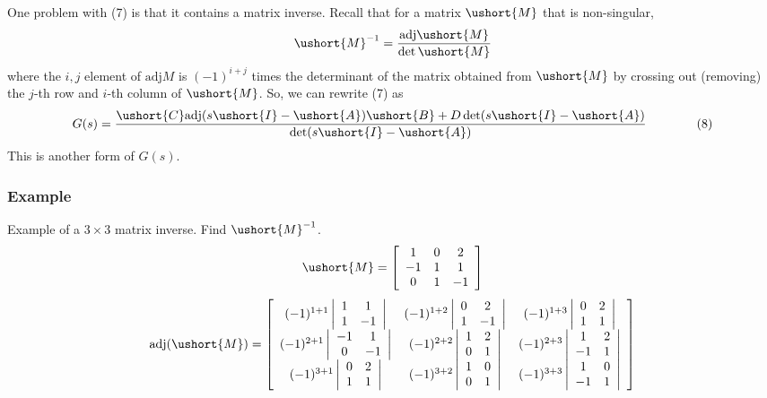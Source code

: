 \documentclass{book}
\newcommand{\adj}{\text{adj}}
\def\ubar#1{\ushort{#1}}
\newcommand{\exmp}{\subsubsection*{Example}}
\begin{document}
One problem with (7) is that it contains a matrix inverse. Recall that for a matrix $ \ubar{M} $ that is non-singular,
\[ \ubar{M}^{-1} = \frac{\adj{\ubar{M}}}{\det{\ubar{M}}} \]
where the $ i,j $ element of $ \adj{M} $ is $ (-1)^{i+j} $ times the determinant of the matrix obtained from $ \ubar{M} $ by crossing out (removing) the $ j $-th row and $ i $-th column of $ \ubar{M} $. So, we can rewrite (7) as 
\[ G(s) = \frac{\ubar{C}\adj(s\ubar{I}-\ubar{A})\ubar{B}+D\det(s\ubar{I}-\ubar{A})}{\det(s\ubar{I}-\ubar{A})} \qquad\qquad (8)\]
This is another form of $ G(s) $.

\exmp
Example of a $ 3\times3 $ matrix inverse. Find $ \ubar{M}^{-1} $.
\[ \ubar{M}=\left[\begin{array}{c c c}
1 & 0 & 2 \\ -1 & 1 & 1 \\ 0 & 1 & -1
\end{array}\right] \]
\[ \adj(\ubar{M}) = \left[\begin{array}{c c c} 
  (-1)^{1+1}  \left|\begin{array}{c c}1&1\\1&-1\end{array}\right| & (-1)^{1+2} \left|\begin{array}{c c}0&2\\1&-1\end{array}\right| & (-1)^{1+3} \left|\begin{array}{c c}0&2\\1&1\end{array}\right| \\
  (-1)^{2+1} \left|\begin{array}{c c}-1&1\\0&-1\end{array}\right| & (-1)^{2+2} \left|\begin{array}{c c}1&2\\0&1\end{array}\right| & (-1)^{2+3} \left|\begin{array}{c c}1&2\\-1&1\end{array}\right| \\
  (-1)^{3+1}  \left|\begin{array}{c c}0&2\\1&1\end{array}\right| & (-1)^{3+2} \left|\begin{array}{c c}1&0\\0&1\end{array}\right| & (-1)^{3+3} \left|\begin{array}{c c}1&0\\-1&1\end{array}\right|
\end{array}\right] \]
\end{document}
